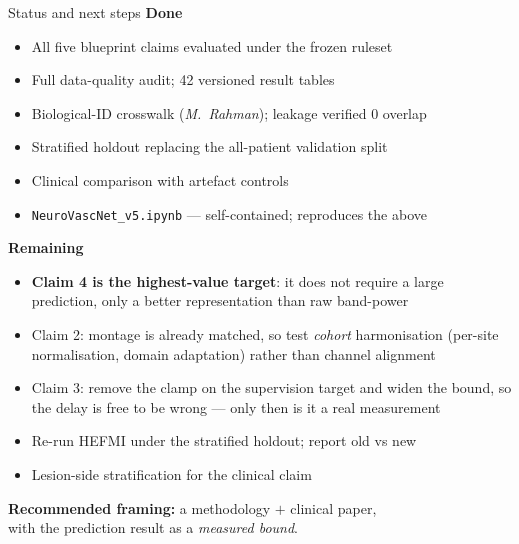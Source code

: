 \documentclass[aspectratio=169,11pt]{beamer}
\begin{document}
\begin{frame}{Status and next steps}
\textbf{Done}
\begin{itemize}
  \item All five blueprint claims evaluated under the frozen ruleset
  \item Full data-quality audit; 42 versioned result tables
  \item Biological-ID crosswalk (\emph{M.\ Rahman}); leakage verified $0$ overlap
  \item Stratified holdout replacing the all-patient validation split
  \item Clinical comparison with artefact controls
  \item \texttt{NeuroVascNet\_v5.ipynb} --- self-contained; reproduces the above
\end{itemize}

\textbf{Remaining}
\begin{itemize}
  \item \textbf{Claim 4 is the highest-value target}: it does not require a large
        prediction, only a better representation than raw band-power
  \item Claim 2: montage is already matched, so test \emph{cohort} harmonisation
        (per-site normalisation, domain adaptation) rather than channel alignment
  \item Claim 3: remove the clamp on the supervision target and widen the bound,
        so the delay is free to be wrong --- only then is it a real measurement
  \item Re-run HEFMI under the stratified holdout; report old vs new
  \item Lesion-side stratification for the clinical claim
\end{itemize}

\vspace{0.4em}
\begin{center}\large
\textbf{Recommended framing:} a methodology $+$ clinical paper, \\
with the prediction result as a \emph{measured bound}.
\end{center}
\end{frame}
\end{document}
